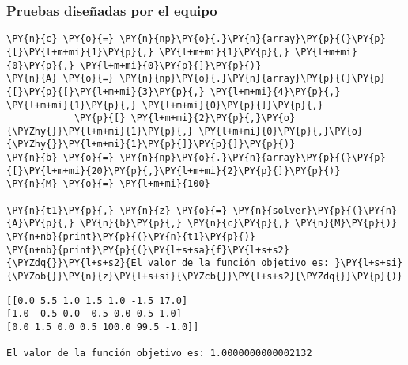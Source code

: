 \documentclass[12pt]{article}
\begin{document}
\subsubsection{Pruebas diseñadas por el equipo}
\begin{tcolorbox}[breakable, size=fbox, boxrule=1pt, pad at break*=1mm,colback=cellbackground, colframe=cellborder]
\begin{Verbatim}[commandchars=\\\{\}]
\PY{n}{c} \PY{o}{=} \PY{n}{np}\PY{o}{.}\PY{n}{array}\PY{p}{(}\PY{p}{[}\PY{l+m+mi}{1}\PY{p}{,} \PY{l+m+mi}{1}\PY{p}{,} \PY{l+m+mi}{0}\PY{p}{,} \PY{l+m+mi}{0}\PY{p}{]}\PY{p}{)}
\PY{n}{A} \PY{o}{=} \PY{n}{np}\PY{o}{.}\PY{n}{array}\PY{p}{(}\PY{p}{[}\PY{p}{[}\PY{l+m+mi}{3}\PY{p}{,} \PY{l+m+mi}{4}\PY{p}{,} \PY{l+m+mi}{1}\PY{p}{,} \PY{l+m+mi}{0}\PY{p}{]}\PY{p}{,}
            \PY{p}{[} \PY{l+m+mi}{2}\PY{p}{,}\PY{o}{\PYZhy{}}\PY{l+m+mi}{1}\PY{p}{,} \PY{l+m+mi}{0}\PY{p}{,}\PY{o}{\PYZhy{}}\PY{l+m+mi}{1}\PY{p}{]}\PY{p}{]}\PY{p}{)}
\PY{n}{b} \PY{o}{=} \PY{n}{np}\PY{o}{.}\PY{n}{array}\PY{p}{(}\PY{p}{[}\PY{l+m+mi}{20}\PY{p}{,}\PY{l+m+mi}{2}\PY{p}{]}\PY{p}{)}
\PY{n}{M} \PY{o}{=} \PY{l+m+mi}{100}

\PY{n}{t1}\PY{p}{,} \PY{n}{z} \PY{o}{=} \PY{n}{solver}\PY{p}{(}\PY{n}{A}\PY{p}{,} \PY{n}{b}\PY{p}{,} \PY{n}{c}\PY{p}{,} \PY{n}{M}\PY{p}{)}
\PY{n+nb}{print}\PY{p}{(}\PY{n}{t1}\PY{p}{)}
\PY{n+nb}{print}\PY{p}{(}\PY{l+s+sa}{f}\PY{l+s+s2}{\PYZdq{}}\PY{l+s+s2}{El valor de la función objetivo es: }\PY{l+s+si}{\PYZob{}}\PY{n}{z}\PY{l+s+si}{\PYZcb{}}\PY{l+s+s2}{\PYZdq{}}\PY{p}{)}
\end{Verbatim}
\end{tcolorbox}

\begin{Verbatim}[commandchars=\\\{\}]
[[0.0 5.5 1.0 1.5 1.0 -1.5 17.0]
[1.0 -0.5 0.0 -0.5 0.0 0.5 1.0]
[0.0 1.5 0.0 0.5 100.0 99.5 -1.0]]

El valor de la función objetivo es: 1.0000000000002132
\end{Verbatim}
\end{document}
